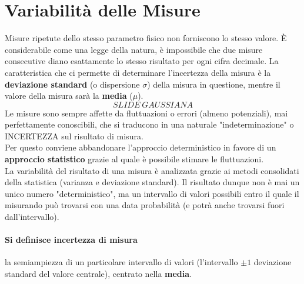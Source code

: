 \documentclass[a4paper,11pt]{report}
\begin{document}
\section{Variabilità delle Misure} Misure ripetute dello stesso parametro fisico non forniscono lo stesso valore. È considerabile come una legge della natura, è impossibile che due misure consecutive diano esattamente lo stesso risultato per ogni cifra decimale. La caratteristica che ci permette di determinare l'incertezza della misura è la \textbf{deviazione standard} (o dispersione $\sigma$) della misura in questione, mentre il valore della misura sarà la \textbf{media} ($\mu$).
$$SLIDE\ GAUSSIANA$$
Le misure sono sempre affette da fluttuazioni o errori (almeno potenziali), mai perfettamente conoscibili, che si traducono in una naturale "indeterminazione" o INCERTEZZA sul risultato di misura.\\
Per questo conviene abbandonare l'approccio deterministico in favore di un \textbf{approccio statistico} grazie al quale è possibile stimare le fluttuazioni.\\
La variabilità del risultato di una misura è analizzata grazie ai metodi consolidati della statistica (varianza e deviazione standard). Il risultato dunque non è mai un unico numero "deterministico", ma un intervallo di valori possibili entro il quale il misurando può trovarsi con una data probabilità (e potrà anche trovarsi fuori dall'intervallo).
\paragraph*{Si definisce incertezza di misura} la semiampiezza di un particolare intervallo di valori (l'intervallo $\pm 1$ deviazione standard del valore centrale), centrato nella \textbf{media}.
\end{document}
